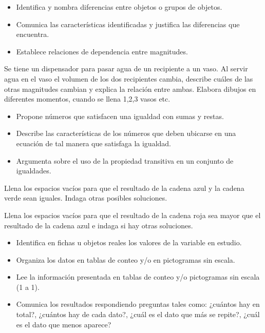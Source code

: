 \evidencias

\begin{itemize}
  \item Identifica y nombra diferencias entre objetos o grupos de objetos.
  \item Comunica las características identificadas y justifica las diferencias que encuentra.
  \item Establece relaciones de dependencia entre magnitudes.
\end{itemize}

\ejemplo

Se tiene un dispensador para pasar agua de un recipiente a un vaso. Al servir agua en el vaso el volumen de los dos recipientes cambia, describe cuáles de las otras magnitudes cambian y explica la relación entre ambas. Elabora dibujos en diferentes momentos, cuando se llena 1,2,3 vasos etc.


\evidencias

\begin{itemize}
  \item Propone números que satisfacen una igualdad con sumas y restas.
  \item Describe las características de los números que deben ubicarse en una ecuación de tal manera que satisfaga la igualdad.
  \item Argumenta sobre el uso de la propiedad transitiva en un conjunto de igualdades.
\end{itemize}

\ejemplo

Llena los espacios vacíos para que el resultado de la cadena azul y la cadena verde sean iguales. Indaga otras posibles soluciones.


Llena los espacios vacíos para que el resultado de la cadena roja sea mayor que el resultado de la cadena azul e indaga si hay otras soluciones.


\evidencias

\begin{itemize}
  \item Identifica en fichas u objetos reales los valores de la variable en estudio.
  \item Organiza los datos en tablas de conteo y/o en pictogramas sin escala.
  \item Lee la información presentada en tablas de conteo y/o pictogramas sin escala (1 a 1).
  \item Comunica los resultados respondiendo preguntas tales como: ¿cuántos hay en total?, ¿cuántos hay de cada dato?, ¿cuál es el dato que más se repite?, ¿cuál es el dato que menos aparece?
\end{itemize}

